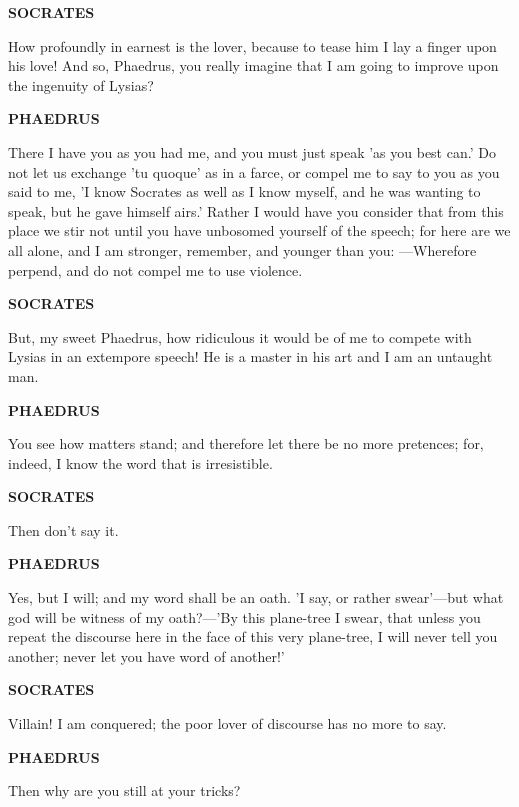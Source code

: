 \documentclass[11pt,letter]{article}
\begin{document}
\par \textbf{SOCRATES}
\par   How profoundly in earnest is the lover, because to tease him I lay a finger upon his love! And so, Phaedrus, you really imagine that I am going to improve upon the ingenuity of Lysias?

\par \textbf{PHAEDRUS}
\par   There I have you as you had me, and you must just speak 'as you best can.' Do not let us exchange 'tu quoque' as in a farce, or compel me to say to you as you said to me, 'I know Socrates as well as I know myself, and he was wanting to speak, but he gave himself airs.' Rather I would have you consider that from this place we stir not until you have unbosomed yourself of the speech; for here are we all alone, and I am stronger, remember, and younger than you: —Wherefore perpend, and do not compel me to use violence.

\par \textbf{SOCRATES}
\par   But, my sweet Phaedrus, how ridiculous it would be of me to compete with Lysias in an extempore speech! He is a master in his art and I am an untaught man.

\par \textbf{PHAEDRUS}
\par   You see how matters stand; and therefore let there be no more pretences; for, indeed, I know the word that is irresistible.

\par \textbf{SOCRATES}
\par   Then don't say it.

\par \textbf{PHAEDRUS}
\par   Yes, but I will; and my word shall be an oath. 'I say, or rather swear'—but what god will be witness of my oath?—'By this plane-tree I swear, that unless you repeat the discourse here in the face of this very plane-tree, I will never tell you another; never let you have word of another!'

\par \textbf{SOCRATES}
\par   Villain! I am conquered; the poor lover of discourse has no more to say.

\par \textbf{PHAEDRUS}
\par   Then why are you still at your tricks?
\end{document}
